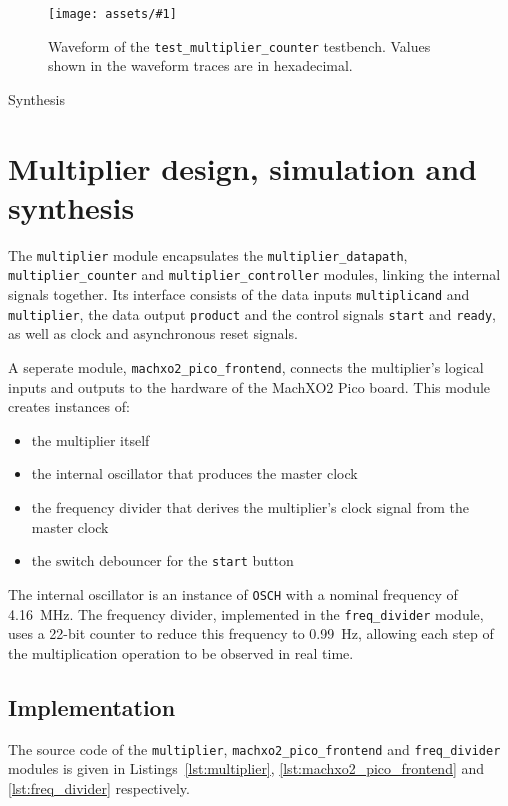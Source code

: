 \documentclass[a4paper]{article}
\newcommand{\waveformfigure}[3]{
  \begin{figure}[p]
    \centering\texttt{[image: assets/\#1]}
    \caption{#2}
    \label{fig:#1}
  \end{figure}
}
\begin{document}
\waveformfigure{test_multiplier_counter}{Waveform of the \texttt{test\_multiplier\_counter} testbench. Values shown in the waveform traces are in hexadecimal.}

\subsection{Synthesis}
\label{sec:seq:synth}


\section{Multiplier design, simulation and synthesis}
\label{sec:mult}

The \texttt{multiplier} module encapsulates the \texttt{multiplier\_datapath}, \texttt{multiplier\_counter} and \texttt{multiplier\_controller} modules, linking the internal signals together. Its interface consists of the data inputs \texttt{multiplicand} and \texttt{multiplier}, the data output \texttt{product} and the control signals \texttt{start} and \texttt{ready}, as well as clock and asynchronous reset signals.

A seperate module, \texttt{machxo2\_pico\_frontend}, connects the multiplier's logical inputs and outputs to the hardware of the MachXO2 Pico board. This module creates instances of:
\begin{itemize}
  \item the multiplier itself
  \item the internal oscillator that produces the master clock
  \item the frequency divider that derives the multiplier's clock signal from the master clock
  \item the switch debouncer for the \texttt{start} button
\end{itemize}
The internal oscillator is an instance of \texttt{OSCH} with a nominal frequency of \SI{4.16}{\mega\hertz}. The frequency divider, implemented in the \texttt{freq\_divider} module, uses a 22-bit counter to reduce this frequency to \SI{0.99}{\hertz}, allowing each step of the multiplication operation to be observed in real time.

\subsection{Implementation}
\label{sec:mult:impl}

The source code of the \texttt{multiplier}, \texttt{machxo2\_pico\_frontend} and \texttt{freq\_divider} modules is given in Listings~\ref{lst:multiplier}, \ref{lst:machxo2_pico_frontend} and \ref{lst:freq_divider} respectively.
\end{document}
